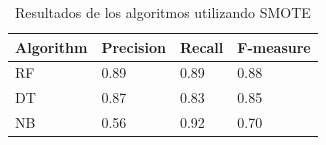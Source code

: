 \begin{table}[H]
\centering
\captionsetup{labelsep=period, labelfont=bf}
\caption{Resultados de los algoritmos utilizando SMOTE}
\fontsize{12pt}{10pt}\selectfont
\begin{tabular}{llll}
\toprule 
\textbf{Algorithm} & \textbf{Precision} & \textbf{Recall} & \textbf{F-measure} \\ 
\midrule 
RF & 0.89 & 0.89 & 0.88 \\ 
DT & 0.87 & 0.83 & 0.85 \\ 
NB & 0.56 & 0.92 & 0.70 \\ 
\bottomrule
\end{tabular}

\label{tab:smote_results}
\end{table}
